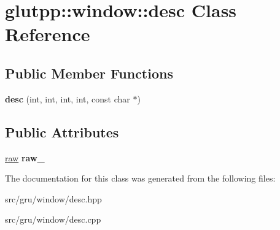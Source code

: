 \hypertarget{classglutpp_1_1window_1_1desc}{\section{glutpp\-:\-:window\-:\-:desc \-Class \-Reference}
\label{classglutpp_1_1window_1_1desc}
}
\subsection*{\-Public \-Member \-Functions}
\begin{DoxyCompactItemize}
\item 
\hypertarget{classglutpp_1_1window_1_1desc_ab63aad03d901472bc8fcaffce4dc84de}{{\bfseries desc} (int, int, int, int, const char $\ast$)}\label{classglutpp_1_1window_1_1desc_ab63aad03d901472bc8fcaffce4dc84de}

\end{DoxyCompactItemize}
\subsection*{\-Public \-Attributes}
\begin{DoxyCompactItemize}
\item 
\hypertarget{classglutpp_1_1window_1_1desc_ae879e3451cc166a1c28b164f88904698}{\hyperlink{structglutpp_1_1window_1_1raw}{raw} {\bfseries raw\-\_\-}}\label{classglutpp_1_1window_1_1desc_ae879e3451cc166a1c28b164f88904698}

\end{DoxyCompactItemize}


\-The documentation for this class was generated from the following files\-:\begin{DoxyCompactItemize}
\item 
src/gru/window/desc.\-hpp\item 
src/gru/window/desc.\-cpp\end{DoxyCompactItemize}
